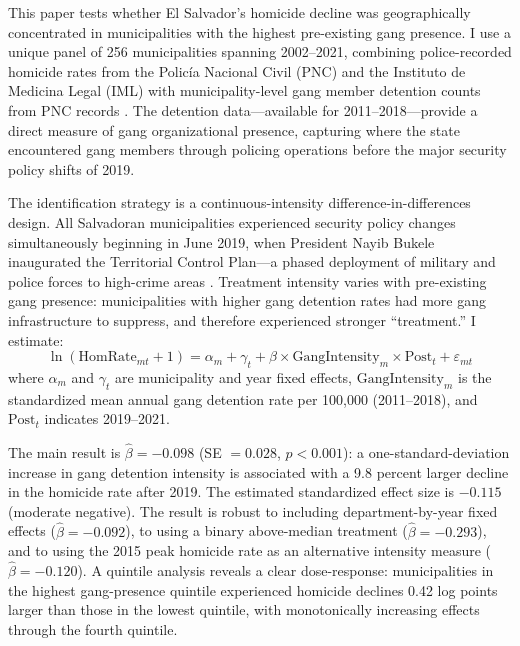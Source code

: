 \documentclass[12pt]{article}
\begin{document}
This paper tests whether El Salvador's homicide decline was geographically concentrated in municipalities with the highest pre-existing gang presence. I use a unique panel of 256 municipalities spanning 2002--2021, combining police-recorded homicide rates from the Polic\'ia Nacional Civil (PNC) and the Instituto de Medicina Legal (IML) with municipality-level gang member detention counts from PNC records \citep{Carcach2025}. The detention data---available for 2011--2018---provide a direct measure of gang organizational presence, capturing where the state encountered gang members through policing operations before the major security policy shifts of 2019.

The identification strategy is a continuous-intensity difference-in-differences design. All Salvadoran municipalities experienced security policy changes simultaneously beginning in June 2019, when President Nayib Bukele inaugurated the Territorial Control Plan---a phased deployment of military and police forces to high-crime areas \citep{Crisis2020}. Treatment intensity varies with pre-existing gang presence: municipalities with higher gang detention rates had more gang infrastructure to suppress, and therefore experienced stronger ``treatment.'' I estimate:
\begin{equation}
\ln(\text{HomRate}_{mt} + 1) = \alpha_m + \gamma_t + \beta \times \text{GangIntensity}_m \times \text{Post}_t + \varepsilon_{mt}
\label{eq:main}
\end{equation}
where $\alpha_m$ and $\gamma_t$ are municipality and year fixed effects, $\text{GangIntensity}_m$ is the standardized mean annual gang detention rate per 100,000 (2011--2018), and $\text{Post}_t$ indicates 2019--2021.

The main result is $\hat{\beta} = -0.098$ (SE $= 0.028$, $p < 0.001$): a one-standard-deviation increase in gang detention intensity is associated with a 9.8 percent larger decline in the homicide rate after 2019. The estimated standardized effect size is $-0.115$ (moderate negative). The result is robust to including department-by-year fixed effects ($\hat{\beta} = -0.092$), to using a binary above-median treatment ($\hat{\beta} = -0.293$), and to using the 2015 peak homicide rate as an alternative intensity measure ($\hat{\beta} = -0.120$). A quintile analysis reveals a clear dose-response: municipalities in the highest gang-presence quintile experienced homicide declines 0.42 log points larger than those in the lowest quintile, with monotonically increasing effects through the fourth quintile.
\end{document}

